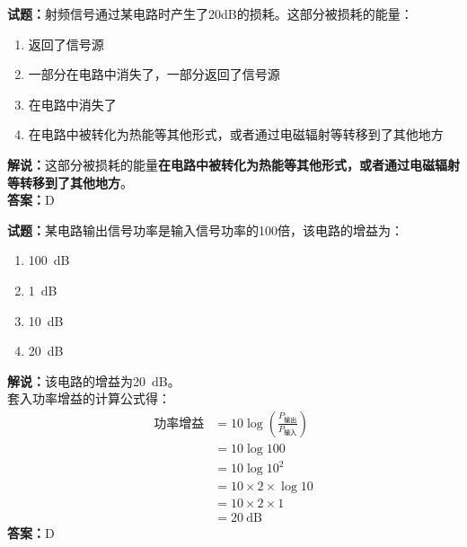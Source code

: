 \documentclass{ctexbook}
\begin{document}
\textbf{试题：}射频信号通过某电路时产生了20dB的损耗。这部分被损耗的能量：
\begin{enumerate}[leftmargin=3em]
  \item 返回了信号源
  \item 一部分在电路中消失了，一部分返回了信号源
  \item 在电路中消失了
  \item 在电路中被转化为热能等其他形式，或者通过电磁辐射等转移到了其他地方
\end{enumerate}
\noindent\textbf{解说：}这部分被损耗的能量\textbf{在电路中被转化为热能等其他形式，或者通过电磁辐射等转移到了其他地方}。\\\noindent\textbf{答案：}D

\vspace{1em}

\textbf{试题：}某电路输出信号功率是输入信号功率的100倍，该电路的增益为：
\begin{enumerate}[leftmargin=3em]
  \item \SI{100}{\dB}
  \item \SI{1}{\dB}
  \item \SI{10}{\dB}
  \item \SI{20}{\dB}
\end{enumerate}
\noindent\textbf{解说：}该电路的增益为\SI{20}{\dB}。\\
套入功率增益的计算公式得：
\begin{equation*}
  \begin{aligned}
    \mbox{功率增益} & =10 \log \left( {\frac{P_{ \mbox{输出} }}{P_{ \mbox{输入} }}} \right) \\
                & = 10 \log 100                                                     \\
                & = 10 \log 10^2                                                    \\
                & = 10 \times 2\times \log 10                                       \\
                & = 10 \times 2\times 1                                             \\
                & = \SI{20}{\dB}
  \end{aligned}
\end{equation*}
\noindent\textbf{答案：}D

\vspace{1em}
\end{document}
